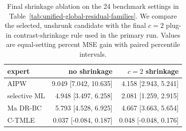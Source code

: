 \begin{table}[t]
\centering
\small
\caption{Final shrinkage ablation on the 24 benchmark settings in Table~\ref{tab:unified-global-residual-families}.  We compare the selected, unshrunk candidate with the final \(c=2\) plug-in contrast-shrinkage rule used in the primary run. Values are equal-setting percent MSE gain with paired percentile intervals.}
\label{tab:no-shrinkage-ablation}
\begin{tabular}{@{}lrr@{}}
\toprule
expert & no shrinkage & \(c=2\) shrinkage \\
\midrule
AIPW & 9.049 [7.042, 10.635] & 4.158 [2.943, 5.241] \\
selective ML & 4.948 [3.497, 6.258] & 2.081 [1.259, 2.915] \\
Ma DR-BC & 5.793 [4.528, 6.925] & 4.667 [3.663, 5.654] \\
C-TMLE & 0.037 [-0.084, 0.187] & 0.048 [-0.048, 0.176] \\
\bottomrule
\end{tabular}
\end{table}
